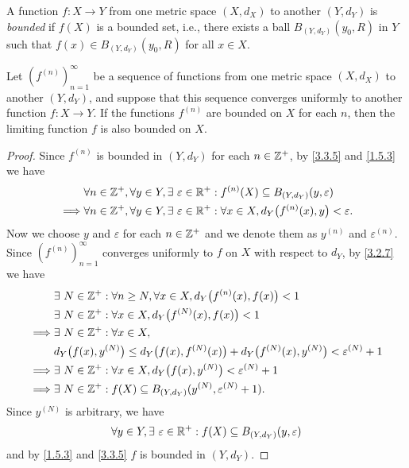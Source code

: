 \begin{defn}\label{3.3.5}
  A function \(f : X \to Y\) from one metric space \((X, d_X)\) to another \((Y, d_Y)\) is \emph{bounded} if \(f(X)\) is a bounded set, i.e., there exists a ball \(B_{(Y, d_Y)}(y_0, R)\) in \(Y\) such that \(f(x) \in B_{(Y, d_Y)}(y_0, R)\) for all \(x \in X\).
\end{defn}

\begin{prop}\label{3.3.6}
  Let \((f^{(n)})_{n = 1}^\infty\) be a sequence of functions from one metric space \((X, d_X)\) to another \((Y, d_Y)\), and suppose that this sequence converges uniformly to another function \(f : X \to Y\).
  If the functions \(f^{(n)}\) are bounded on \(X\) for each \(n\), then the limiting function \(f\) is also bounded on \(X\).
\end{prop}

\begin{proof}
  Since \(f^{(n)}\) is bounded in \((Y, d_Y)\) for each \(n \in \mathbb{Z}^+\), by \cref{3.3.5} and \cref{1.5.3} we have
  \begin{align*}
             & \forall n \in \Z^+, \forall y \in Y, \exists\ \varepsilon \in \R^+ : f^{(n)}(X) \subseteq B_{(Y, d_Y)}(y, \varepsilon)          \\
    \implies & \forall n \in \Z^+, \forall y \in Y, \exists\ \varepsilon \in \R^+ : \forall x \in X, d_Y\big(f^{(n)}(x), y\big) < \varepsilon.
  \end{align*}
  Now we choose \(y\) and \(\varepsilon\) for each \(n \in \mathbb{Z}^+\) and we denote them as \(y^{(n)}\) and \(\varepsilon^{(n)}\).
  Since \((f^{(n)})_{n = 1}^\infty\) converges uniformly to \(f\) on \(X\) with respect to \(d_Y\), by \cref{3.2.7} we have
  \begin{align*}
             & \exists\ N \in \mathbb{Z}^+ : \forall n \geq N, \forall x \in X, d_Y\big(f^{(n)}(x), f(x)\big) < 1                               \\
             & \exists\ N \in \mathbb{Z}^+ : \forall x \in X, d_Y\big(f^{(N)}(x), f(x)\big) < 1                                                 \\
    \implies & \exists\ N \in \mathbb{Z}^+ : \forall x \in X,                                                                                   \\
             & d_Y\big(f(x), y^{(N)}\big) \leq d_Y\big(f(x), f^{(N)}(x)\big) + d_Y\big(f^{(N)}(x), y^{(N)}\big) < \varepsilon^{(N)} + 1 \\
    \implies & \exists\ N \in \mathbb{Z}^+ : \forall x \in X, d_Y\big(f(x), y^{(N)}\big) < \varepsilon^{(N)} + 1                                \\
    \implies & \exists\ N \in \mathbb{Z}^+ : f(X) \subseteq B_{(Y, d_Y)}(y^{(N)}, \varepsilon^{(N)} + 1).
  \end{align*}
  Since \(y^{(N)}\) is arbitrary, we have
  \[
    \forall y \in Y, \exists\ \varepsilon \in \mathbb{R}^+ : f(X) \subseteq B_{(Y, d_Y)}(y, \varepsilon)
  \]
  and by \cref{1.5.3} and \cref{3.3.5} \(f\) is bounded in \((Y, d_Y)\).
\end{proof}

